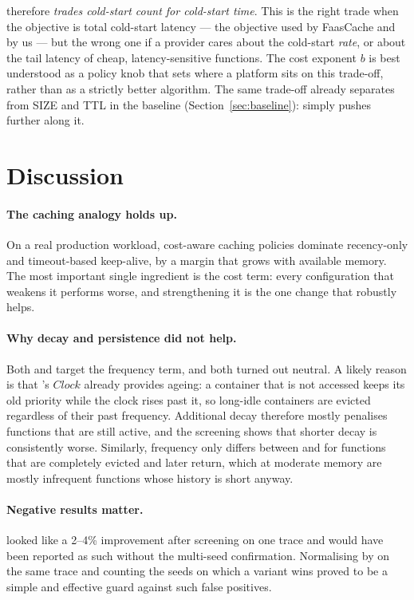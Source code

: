 \documentclass[11pt,a4paper]{article}
\newcommand{\gd}{\text{GD}}
\newcommand{\gdw}{\text{GD-W}}
\newcommand{\gdd}{\text{GD-D}}
\newcommand{\gdh}{\text{GD-H}}
\begin{document}
\gdw{} therefore \emph{trades cold-start count for cold-start time}. This is the right trade
when the objective is total cold-start latency --- the objective used by FaasCache and by us ---
but the wrong one if a provider cares about the cold-start \emph{rate}, or about the tail latency
of cheap, latency-sensitive functions. The cost exponent $b$ is best understood as a policy knob
that sets where a platform sits on this trade-off, rather than as a strictly better
algorithm. The same trade-off already separates \gd{} from SIZE and TTL in the baseline
(Section~\ref{sec:baseline}): \gdw{} simply pushes further along it.

\section{Discussion}
\label{sec:discussion}

\paragraph{The caching analogy holds up.} On a real production workload, cost-aware caching
policies dominate recency-only and timeout-based keep-alive, by a margin that grows with
available memory. The most important single ingredient is the cost term: every configuration
that weakens it performs worse, and strengthening it is the one change that robustly helps.

\paragraph{Why decay and persistence did not help.} Both \gdd{} and \gdh{} target the frequency
term, and both turned out neutral. A likely reason is that \gd{}'s $\mathit{Clock}$ already
provides ageing: a container that is not accessed keeps its old priority while the clock rises
past it, so long-idle containers are evicted regardless of their past frequency. Additional
decay therefore mostly penalises functions that are still active, and the screening shows that
shorter decay is consistently worse. Similarly, frequency only differs between \gd{} and \gdh{}
for functions that are completely evicted and later return, which at moderate memory are mostly
infrequent functions whose history is short anyway.

\paragraph{Negative results matter.} \gdh{} looked like a 2--4\% improvement after screening on
one trace and would have been reported as such without the multi-seed confirmation. Normalising
by \gd{} on the same trace and counting the seeds on which a variant wins proved to be a simple
and effective guard against such false positives.
\end{document}
